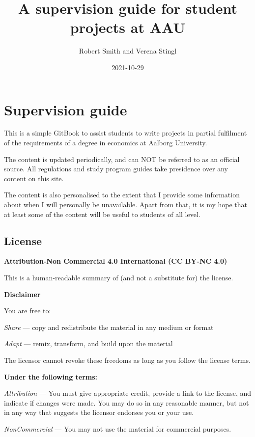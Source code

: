 \documentclass[
]{book}
\title{A supervision guide for student projects at AAU}
\author{Robert Smith and Verena Stingl}
\date{2021-10-29}
\begin{document}
\maketitle

{
\setcounter{tocdepth}{1}
\tableofcontents
}
\hypertarget{supervision-guide}{%
\chapter{Supervision guide}\label{supervision-guide}}

This is a simple GitBook to assist students to write projects in partial fulfilment of the requirements of a degree in economics at Aalborg University.

The content is updated periodically, and can NOT be referred to as an official source. All regulations and study program guides take presidence over any content on this site.

The content is also personalised to the extent that I provide some information about when I will personally be unavailable. Apart from that, it is my hope that at least some of the content will be useful to students of all level.

\hypertarget{license}{%
\section{License}\label{license}}

\textbf{Attribution-Non Commercial 4.0 International (CC BY-NC 4.0)}

This is a human-readable summary of (and not a substitute for) the license.

\textbf{Disclaimer}

You are free to:

\emph{Share} --- copy and redistribute the material in any medium or format

\emph{Adapt} --- remix, transform, and build upon the material

The licensor cannot revoke these freedoms as long as you follow the license terms.

\textbf{Under the following terms:}

\emph{Attribution} --- You must give appropriate credit, provide a link to the license, and indicate if changes were made. You may do so in any reasonable manner, but not in any way that suggests the licensor endorses you or your use.

\emph{NonCommercial} --- You may not use the material for commercial purposes.
\end{document}
